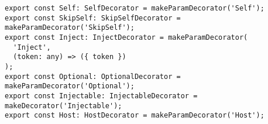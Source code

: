 \begin{verbatim}
export const Self: SelfDecorator = makeParamDecorator('Self');
export const SkipSelf: SkipSelfDecorator = makeParamDecorator('SkipSelf');
export const Inject: InjectDecorator = makeParamDecorator(
  'Inject',
  (token: any) => ({ token })
);
export const Optional: OptionalDecorator = makeParamDecorator('Optional');
export const Injectable: InjectableDecorator = makeDecorator('Injectable');
export const Host: HostDecorator = makeParamDecorator('Host');
\end{verbatim}
